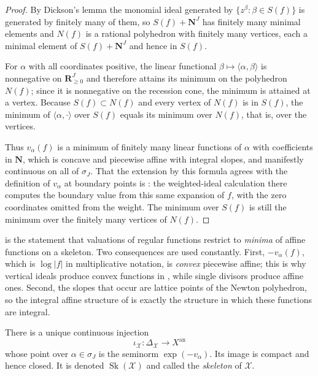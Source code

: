 \begin{proof}
By Dickson's lemma the monomial ideal generated by $\{z^\beta:\beta\in
S(f)\}$ is generated by finitely many of them, so $S(f)+\mathbf N^J$ has
finitely many minimal elements and $N(f)$ is a rational polyhedron with
finitely many vertices, each a minimal element of $S(f)+\mathbf N^J$ and
hence in $S(f)$.

For $\alpha$ with all coordinates positive, the linear functional
$\beta\mapsto\langle\alpha,\beta\rangle$ is nonnegative on
$\mathbf R_{\geq0}^J$ and therefore attains its minimum on the polyhedron
$N(f)$; since it is nonnegative on the recession cone, the minimum is
attained at a vertex. Because $S(f)\subset N(f)$ and every vertex of
$N(f)$ is in $S(f)$, the minimum of $\langle\alpha,\cdot\rangle$ over
$S(f)$ equals its minimum over $N(f)$, that is, over the vertices.

Thus $v_\alpha(f)$ is a minimum of finitely many linear functions of
$\alpha$ with coefficients in $\mathbf N$, which is concave and
piecewise affine with integral slopes, and manifestly continuous on all of
$\sigma_J$. That the extension by this formula agrees with the
definition of $v_\alpha$ at boundary points is
: the weighted-ideal calculation
there computes the boundary value from this same expansion of $f$, with
the zero coordinates omitted from the weight. The minimum over $S(f)$
is still the minimum over the finitely many vertices of $N(f)$.
\end{proof}

\begin{remark}
\label{rem:newton-tropical}
 is the statement that valuations of regular
functions restrict to \emph{minima} of affine functions on a skeleton. Two
consequences are used constantly. First, $-v_\alpha(f)$, which is
$\log|f|$ in multiplicative notation, is \emph{convex} piecewise affine;
this is why vertical ideals produce convex functions in
, while single divisors produce affine
ones. Second, the slopes that occur are lattice points of the Newton
polyhedron, so the integral affine structure of
 is exactly the structure in which these
functions are integral.
\end{remark}

\begin{theorem}\label{thm:skeleton-embedding}
There is a unique continuous injection
\[
       \iota_{\mathcal X}:\Delta_{\mathcal X}\longrightarrow X^{\mathrm{an}}
\]
whose point over $\alpha\in\sigma_J$ is the seminorm
$\exp(-v_\alpha)$. Its image is compact and hence closed. It is denoted
$\operatorname{Sk}(\mathcal X)$ and called the \emph{skeleton} of
$\mathcal X$.
\end{theorem}

